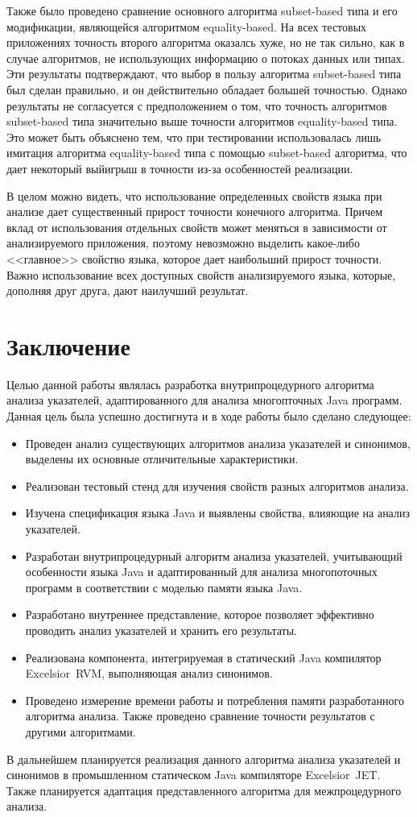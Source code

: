\documentclass[14pt,titlepage]{extarticle}
\newcommand{\eng}[1]{{\English#1}}
\let\oldsection\section
\renewcommand{\section}{\newpage\oldsection}
\newcommand{\sectionwithoutnumber}[1]{
  \section*{#1}
  \addcontentsline{toc}{section}{#1}
}
\newcommand{\java}{\eng{Java}\xspace}
\begin{document}
      Также было проведено сравнение основного алгоритма \eng{subset-based}
      типа и его модификации, являющейся алгоритмом \eng{equality-based}. На
      всех тестовых приложениях точность второго алгоритма оказалсь хуже, но не
      так сильно, как в случае алгоритмов, не использующих информацию о потоках
      данных или типах. Эти результаты подтверждают, что выбор в пользу
      алгоритма \eng{subset-based} типа был сделан правильно, и он
      действительно обладает большей точностью. Однако результаты не
      согласуется с предположением о том, что точность алгоритмов
      \eng{subset-based} типа значительно выше точности алгоритмов
      \eng{equality-based} типа. Это может быть объяснено тем, что при
      тестировании использовалась лишь имитация алгоритма \eng{equality-based}
      типа с помощью \eng{subset-based} алгоритма, что дает некоторый выйигрыш
      в точности из-за особенностей реализации.

      В целом можно видеть, что использование определенных свойств языка при
      анализе дает существенный прирост точности конечного алгоритма. Причем
      вклад от использования отдельных свойств может меняться в зависимости от
      анализируемого приложения, поэтому невозможно выделить какое-либо
      <<главное>> свойство языка, которое дает наибольший прирост точности.
      Важно использование всех доступных свойств анализируемого языка, которые,
      дополняя друг друга, дают наилучший результат.


  \sectionwithoutnumber{Заключение}

    Целью данной работы являлась разработка внутрипроцедурного алгоритма
    анализа указателей, адаптированного для анализа многопточных \java программ.
    Данная цель была успешно достигнута и в ходе работы было сделано следующее:
    \begin{itemize}
      \item Проведен анализ существующих алгоритмов анализа указателей и
            синонимов, выделены их основные отличительные характеристики.
      \item Реализован тестовый стенд для изучения свойств разных алгоритмов
            анализа.
      \item Изучена спецификация языка \java и выявлены свойства, влияющие на
            анализ указателей.
      \item Разработан внутрипроцедурный алгоритм анализа указателей,
            учитывающий особенности языка \java и адаптированный для анализа
            многопоточных программ в соответствии с моделью памяти языка \java.
      \item Разработано внутреннее представление, которое позволяет эффективно
            проводить анализ указателей и хранить его результаты.
      \item Реализована компонента, интегрируемая в статический \java компилятор
            \eng{Excelsior~RVM}, выполняющая анализ синонимов.
      \item Проведено измерение времени работы и потребления памяти
            разработанного алгоритма анализа. Также проведено сравнение
            точности результатов с другими алгоритмами.
    \end{itemize}

    В дальнейшем планируется реализация данного алгоритма анализа указателей и
    синонимов в промышленном статическом \java компиляторе \eng{Excelsior~JET}.
    Также планируется адаптация представленного алгоритма для межпроцедурного
    анализа.

  \newpage
  
\end{document}
